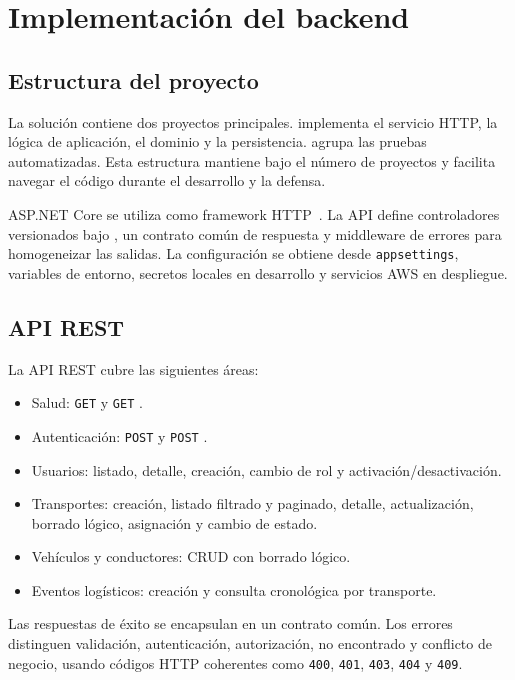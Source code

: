 \chapter{Implementación del backend}
\label{chap:implementacion-backend}

\section{Estructura del proyecto}
\label{sec:estructura-proyecto}

La solución contiene dos proyectos principales.  implementa el servicio HTTP, la lógica de aplicación, el dominio y la persistencia.  agrupa las pruebas automatizadas. Esta estructura mantiene bajo el número de proyectos y facilita navegar el código durante el desarrollo y la defensa.

ASP.NET Core se utiliza como framework HTTP~\cite{MicrosoftAspNetCoreDocs}. La API define controladores versionados bajo , un contrato común de respuesta y middleware de errores para homogeneizar las salidas. La configuración se obtiene desde \texttt{appsettings}, variables de entorno, secretos locales en desarrollo y servicios AWS en despliegue.

\section{API REST}
\label{sec:api-rest}

La API REST cubre las siguientes áreas:

\begin{itemize}
  \item Salud: \texttt{GET}  y \texttt{GET} .
  \item Autenticación: \texttt{POST}  y \texttt{POST} .
  \item Usuarios: listado, detalle, creación, cambio de rol y activación/desactivación.
  \item Transportes: creación, listado filtrado y paginado, detalle, actualización, borrado lógico, asignación y cambio de estado.
  \item Vehículos y conductores: CRUD con borrado lógico.
  \item Eventos logísticos: creación y consulta cronológica por transporte.
\end{itemize}

Las respuestas de éxito se encapsulan en un contrato común. Los errores distinguen validación, autenticación, autorización, no encontrado y conflicto de negocio, usando códigos HTTP coherentes como \texttt{400}, \texttt{401}, \texttt{403}, \texttt{404} y \texttt{409}.

